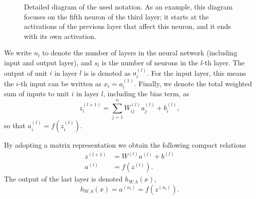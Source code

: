 \documentclass{article}
\begin{document}
\begin{figure}[ht]
\def\layersep{2.5cm}
\centering
{}
\caption{Detailed diagram of the used notation. As an example, this diagram focuses on the fifth neuron of the third layer; it starts at the activations of the previous layer that affect this neuron, and it ends with its own activation.}
\label{fig:neuron}
\end{figure}

We write $n_l$ to denote the number of layers in the neural network (including input and output layer), and $s_l$ is the number of neurons in the $l$-th layer. The output of unit $i$ in layer $l$ is is denoted as $a_i^{(l)}$. For the input layer, this means the $i$-th input can be written as $x_i = a_i^{(1)}$. Finally, we denote the total weighted sum of inputs to unit $i$ in layer $l$, including the bias term, as
\begin{equation}
z_i^{(l+1)} = \sum_{j=1}^{s_{l}} W^{(l)}_{ij} a_j^{(l)} + b^{(l)}_i,
\label{eq:weightedsum}
\end{equation}
so that $a^{(l)}_i = f(z^{(l)}_i)$.

By adopting a matrix representation we obtain the following compact relations
\begin{align}
z^{(l+1)} & = W^{(l)} a^{(l)} + b^{(l)} \\
a^{(l)} & = f(z^{(l)}).
\end{align}
The output of the last layer is denoted $h_{W,b}(x)$,
\begin{equation}
h_{W,b}(x) = a^{(n_l)} = f(z^{(n_l)}).
\end{equation}
\end{document}
